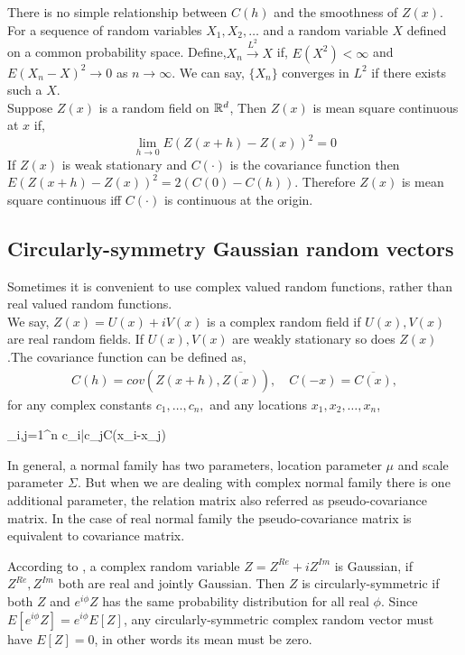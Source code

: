 There is no simple relationship between $C(h)$ and the smoothness of $Z(x)$. For a sequence of random variables $X_1, X_2,\ldots$ and a random variable $X$ defined on a common probability space. Define,$X_n\overset{L^2}\to X$ if, $E(X^2)<\infty$ and $E(X_n - X)^2\to 0$ as $n \rightarrow \infty$. We can say, $\{X_n\}$ converges in $L^2$ if there exists such a $X$.\\

Suppose $Z(x)$ is a random field on $\mathbb{R}^d$, Then $Z(x)$ is mean square continuous at $x$ if, $$\lim_{h\to 0} E(Z(x+h)-Z(x))^2 =0$$
If $Z(x)$ is weak stationary and $C(\cdot)$ is the covariance function then $E(Z(x+h)-Z(x))^2=2(C(0)-C(h))$. Therefore $Z(x)$ is mean square continuous iff $C(\cdot)$ is continuous at the origin.


\subsection{Circularly-symmetry Gaussian random vectors}

Sometimes it is convenient to use complex valued random functions, rather than real valued random functions. \\

We say, $Z(x)=U(x) + i V(x)$ is a complex random field if $U(x),V(x)$ are real random fields. If $U(x),V(x)$ are weakly stationary so does $Z(x)$.The covariance function can be defined as,
\begin{eqnarray*}
	C(h) = cov(Z(x+h), \overline{Z(x)}), \quad C(-x)=\overline{C(x)},
\end{eqnarray*}
for any complex constants $c_1,\ldots, c_n,$ and any locations $x_1, x_2, \ldots, x_n$,

\beq \sum_{i,j=1}^n c_i\bar{c_j}C(x_i-x_j)\eeq

In general, a normal family has two parameters, location parameter $\mu$ and scale parameter $\Sigma$. But when we are dealing with complex normal family there is one additional parameter, the relation matrix also referred as pseudo-covariance matrix. In the case of real normal family the pseudo-covariance matrix is equivalent to covariance matrix.

According to \cite{Gallager2008}, a complex random variable $Z = Z^{Re} + iZ^{Im}$ is Gaussian, if $Z^{Re}, Z^{Im}$ both are real and jointly Gaussian. Then $Z$ is circularly-symmetric if both $ Z$ and $e^{i\phi} Z$ has the same probability distribution for all real $\phi$.  Since $E[e^{i\phi}Z] = e^{i\phi}E[Z]$, any circularly-symmetric complex random vector must have $E[Z]=0$, in other words its mean must be zero.

